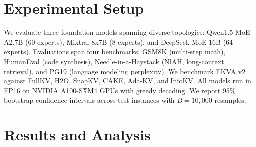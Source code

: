\documentclass[conference]{IEEEtran}
\begin{document}
\section{Experimental Setup}
We evaluate three foundation models spanning diverse topologies: Qwen1.5-MoE-A2.7B (60 experts), Mixtral-8x7B (8 experts), and DeepSeek-MoE-16B (64 experts). Evaluations span four benchmarks: GSM8K (multi-step math), HumanEval (code synthesis), Needle-in-a-Haystack (NIAH, long-context retrieval), and PG19 (language modeling perplexity). We benchmark EKVA v2 against FullKV, H2O, SnapKV, CAKE, Ada-KV, and InfoKV. All models run in FP16 on NVIDIA A100-SXM4 GPUs with greedy decoding. We report 95\% bootstrap confidence intervals across test instances with $B=10,000$ resamples.

\section{Results and Analysis}
\end{document}
